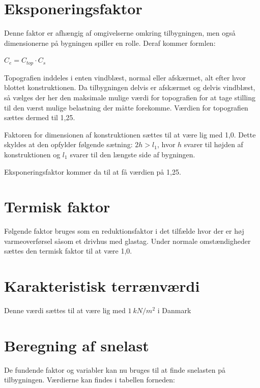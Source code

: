 \section{Eksponeringsfaktor}
Denne faktor er afhængig af omgivelserne omkring tilbygningen, men også dimensionerne på bygningen spiller en rolle. Deraf kommer formlen:

$C_e = C_{top} \cdot  C_s$

Topografien inddeles i enten vindblæst, normal eller afskærmet, alt efter hvor blottet konstruktionen. Da tilbygningen delvis er afskærmet og delvis vindblæst, så vælges der her den maksimale mulige værdi for topografien for at tage stilling til den værst mulige belastning der måtte forekomme. Værdien for topografien sættes dermed til 1,25.

Faktoren for dimensionen af konstruktionen sættes til at være lig med 1,0. Dette skyldes at den opfylder følgende sætning: $2h > l_1$, hvor $h$ svarer til højden af konstruktionen og $l_1$ svarer til den længste side af bygningen.

Eksponeringsfaktor kommer da til at få værdien på 1,25.

\section{Termisk faktor}
Følgende faktor bruges som en reduktionsfaktor i det tilfælde hvor der er høj varmeoverførsel såsom et drivhus med glastag. Under normale omstændigheder sættes den termisk faktor til at være 1,0.

\section{Karakteristisk terrænværdi}
Denne værdi sættes til at være lig med $\SI{1}{ kN/m^2}$ i Danmark

\section{Beregning af snelast}
De fundende faktor og variabler kan nu bruges til at finde snelasten på tilbygningen. Værdierne kan findes i tabellen forneden:

